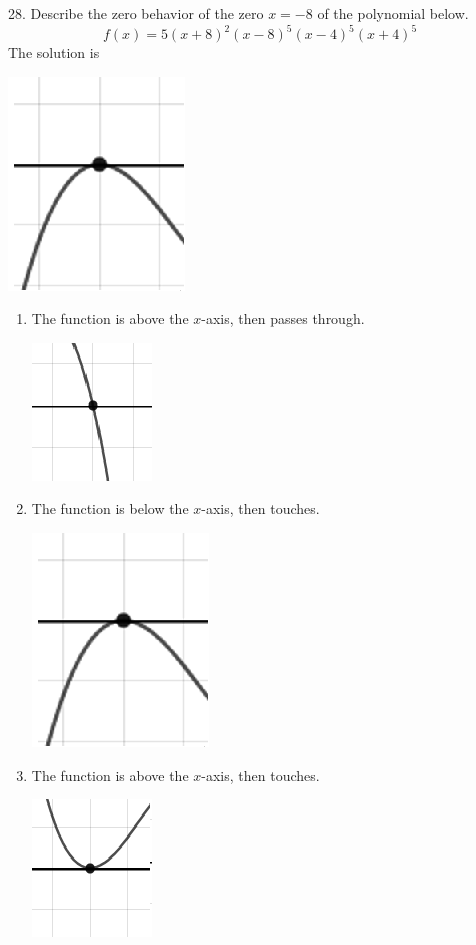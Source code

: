 \documentclass{article}[10pt]
\begin{document}
28. Describe the zero behavior of the zero $x = -8$ of the polynomial below.
$$ f(x) = 5(x + 8)^{2}(x - 8)^{5}(x - 4)^{5}(x + 4)^{5} $$ 
The solution is  
\begin{center}\includegraphics[scale=0.5]{../Figures/zeroBehaviorNegativeEven.png}\end{center}\begin{enumerate}[label=\Alph*.] 
\item The function is above the $x$-axis, then passes through. 
\begin{center}\includegraphics[scale=0.5]{../Figures/zeroBehaviorNegativeOdd.png}\end{center} 
 
\item The function is below the $x$-axis, then touches. 
\begin{center}\includegraphics[scale=0.5]{../Figures/zeroBehaviorNegativeEven.png}\end{center} 
 
\item The function is above the $x$-axis, then touches. 
\begin{center}\includegraphics[scale=0.5]{../Figures/zeroBehaviorPositiveEven.png}\end{center} 
 

\end{enumerate}
\end{document}
